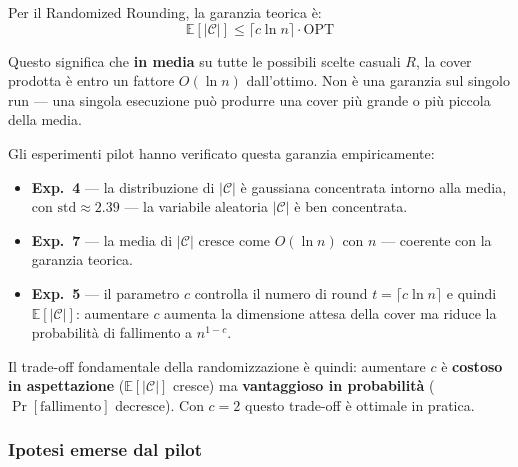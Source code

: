 \documentclass[12pt, a4paper]{article}
\begin{document}
Per il Randomized Rounding, la garanzia teorica \`e:
$$\mathbb{E}[|\mathcal{C}|] \leq \lceil c \ln n \rceil \cdot \mathrm{OPT}$$

Questo significa che \textbf{in media} su tutte le possibili scelte 
casuali $R$, la cover prodotta \`e entro un fattore $O(\ln n)$ 
dall'ottimo. Non \`e una garanzia sul singolo run — una singola 
esecuzione pu\`o produrre una cover pi\`u grande o pi\`u piccola 
della media.

Gli esperimenti pilot hanno verificato questa garanzia empiricamente:

\begin{itemize}
    \item \textbf{Exp.~4} — la distribuzione di $|\mathcal{C}|$ 
    \`e gaussiana concentrata intorno alla media, con 
    $\mathrm{std} \approx 2.39$ — la variabile aleatoria 
    $|\mathcal{C}|$ \`e ben concentrata.

    \item \textbf{Exp.~7} — la media di $|\mathcal{C}|$ cresce 
    come $O(\ln n)$ con $n$ — coerente con la garanzia teorica.

    \item \textbf{Exp.~5} — il parametro $c$ controlla il numero 
    di round $t = \lceil c \ln n \rceil$ e quindi 
    $\mathbb{E}[|\mathcal{C}|]$: aumentare $c$ aumenta la 
    dimensione attesa della cover ma riduce la probabilit\`a 
    di fallimento a $n^{1-c}$.
\end{itemize}

Il trade-off fondamentale della randomizzazione \`e quindi:
aumentare $c$ \`e \textbf{costoso in aspettazione} 
($\mathbb{E}[|\mathcal{C}|]$ cresce) ma \textbf{vantaggioso 
in probabilit\`a} ($\Pr[\text{fallimento}]$ decresce). 
Con $c=2$ questo trade-off \`e ottimale in pratica.

\subsubsection*{Ipotesi emerse dal pilot}
\end{document}

